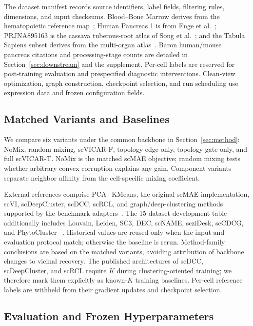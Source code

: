 The dataset manifest records source identifiers, label fields, filtering rules,
dimensions, and input checksums. Blood--Bone Marrow derives from the hematopoietic
reference map~\cite{triana2021hematopoietic}; Human Pancreas 1 is from Enge et
al.~\cite{enge2017pancreas}; PRJNA895163 is the cassava tuberous-root atlas of
Song et al.~\cite{song2022cassava}; and the Tabula Sapiens subset derives from
the multi-organ atlas~\cite{tabulasapiens2022atlas}.  Baron human/mouse pancreas
citations and processing-stage counts are detailed in
Section~\ref{sec:downstream} and the supplement.
Per-cell labels are reserved for post-training evaluation and prespecified
diagnostic interventions. Clean-view optimization, graph construction,
checkpoint selection, and run scheduling use expression data and frozen
configuration fields.

\subsection{Matched Variants and Baselines}

We compare six variants under the common backbone in Section~\ref{sec:method}:
NoMix, random mixing, scVICAR-F, topology edge-only, topology gate-only, and
full scVICAR-T.  NoMix is the matched scMAE objective; random mixing tests
whether arbitrary convex corruption explains any gain.  Component variants
separate neighbor affinity from the cell-specific mixing coefficient.

External references comprise PCA+KMeans, the original scMAE implementation,
scVI, scDeepCluster, scDCC, scRCL, and graph/deep-clustering methods supported by
the benchmark adapters~\cite{lopez2018scvi,tian2019scdeepcluster,tian2021scdcc,peng2024scrcl}.
The 15-dataset development table additionally includes Louvain, Leiden, SC3,
DEC, scNAME, scziDesk, scCDCG, and PhytoCluster
~\cite{blondel2008louvain,traag2019leiden,kiselev2017sc3,xie2016dec,wan2022scname,chen2020sczidesk,xu2024sccdcg,wang2025phytocluster}.
Historical values are reused only when the input and evaluation protocol match;
otherwise the baseline is rerun. Method-family conclusions are based on the
matched variants, avoiding attribution of backbone changes to vicinal recovery. The
published architectures of scDCC, scDeepCluster, and scRCL require $K$ during
clustering-oriented training; we therefore mark them explicitly as known-$K$
training baselines.  Per-cell reference labels are withheld from their gradient
updates and checkpoint selection.

\subsection{Evaluation and Frozen Hyperparameters}

